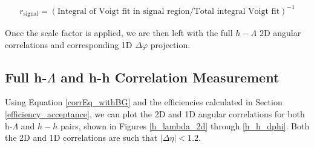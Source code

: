 \documentclass[ALICE,manyauthors]{ALICE_analysis_notes}
\begin{document}
\begin{align}
	r_{\text{signal}} = (\text{Integral of Voigt fit in signal region} / \text{Total integral Voigt fit})^{-1}
\end{align}

Once the scale factor is applied, we are then left with the full $h-\Lambda$ 2D angular correlations and corresponding 1D $\Delta\varphi$ projection.

\subsection{Full h-$\Lambda$ and h-h Correlation Measurement}

Using Equation \ref{corrEq_withBG} and the efficiencies calculated in Section \ref{efficiency_acceptance}, we can plot the 2D and 1D angular correlations for both h-$\Lambda$ and $h-h$ pairs, shown in Figures \ref{h_lambda_2d} through \ref{h_h_dphi}. Both the 2D and 1D correlations are such that $|\Delta\eta| < 1.2$.
\end{document}
